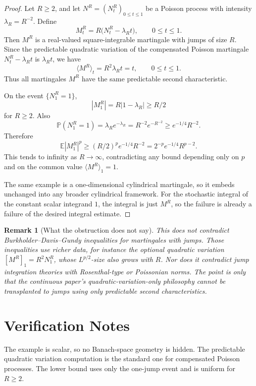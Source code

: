 \documentclass[11pt]{article}
\newtheorem{remark}{Remark}
\newcommand{\E}{\mathbb E}
\newcommand{\Pp}{\mathbb P}
\begin{document}
\begin{proof}
Let \(R\geq 2\), and let \(N^R=(N^R_t)_{0\leq t\leq 1}\) be a Poisson process
with intensity \(\lambda_R=R^{-2}\).  Define
\[
   M^R_t = R\bigl(N^R_t-\lambda_R t\bigr), \qquad 0\leq t\leq 1.
\]
Then \(M^R\) is a real-valued square-integrable martingale with jumps of size
\(R\).  Since the predictable quadratic variation of the compensated Poisson
martingale \(N^R_t-\lambda_R t\) is \(\lambda_R t\), we have
\[
   \langle M^R\rangle_t = R^2\lambda_R t = t,
   \qquad 0\leq t\leq 1.
\]
Thus all martingales \(M^R\) have the same predictable second characteristic.

On the event \(\{N^R_1=1\}\),
\[
   |M^R_1| = R|1-\lambda_R| \geq R/2
\]
for \(R\geq 2\).  Also
\[
   \Pp(N^R_1=1)=\lambda_R e^{-\lambda_R}
      =R^{-2}e^{-R^{-2}} \geq e^{-1/4}R^{-2}.
\]
Therefore
\[
   \E |M^R_1|^p
   \geq (R/2)^p e^{-1/4}R^{-2}
   = 2^{-p}e^{-1/4} R^{p-2}.
\]
This tends to infinity as \(R\to\infty\), contradicting any bound depending
only on \(p\) and on the common value \(\langle M^R\rangle_1=1\).

The same example is a one-dimensional cylindrical martingale, so it embeds
unchanged into any broader cylindrical framework.  For the stochastic integral
of the constant scalar integrand \(1\), the integral is just \(M^R\), so the
failure is already a failure of the desired integral estimate.
\end{proof}

\begin{remark}[What the obstruction does not say]
This does not contradict Burkholder--Davis--Gundy inequalities for martingales
with jumps.  Those inequalities use richer data, for instance the optional
quadratic variation \([M^R]_1=R^2N^R_1\), whose \(L^{p/2}\)-size also grows
with \(R\).  Nor does it contradict jump integration theories with
Rosenthal-type or Poissonian norms.  The point is only that the continuous
paper's quadratic-variation-only philosophy cannot be transplanted to jumps
using only predictable second characteristics.
\end{remark}

\section*{Verification Notes}

The example is scalar, so no Banach-space geometry is hidden.  The predictable
quadratic variation computation is the standard one for compensated Poisson
processes.  The lower bound uses only the one-jump event and is uniform for
\(R\geq2\).
\end{document}
